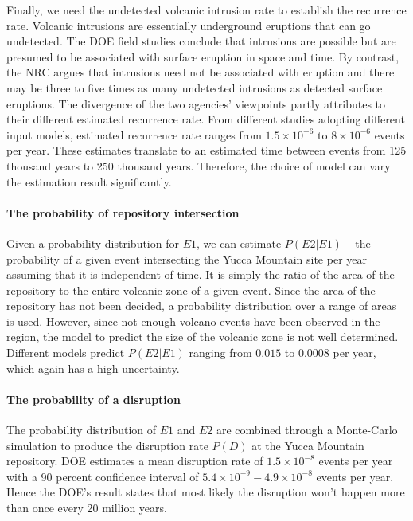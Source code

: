 \documentclass[nofootinbib,preprint,aps]{revtex4-1}
\begin{document}
        Finally, we need the undetected volcanic intrusion rate to establish the recurrence rate. Volcanic
        intrusions are essentially underground eruptions that can go undetected. The DOE field studies conclude
        that intrusions are possible but are presumed to be associated with surface eruption in space and time. 
        By contrast, the NRC argues that intrusions need not be associated with eruption and there
        may be three to five times as many undetected intrusions as detected surface eruptions. The divergence
        of the two agencies' viewpoints partly attributes to their different estimated recurrence rate.
        From different studies adopting different input models, estimated recurrence rate ranges from
        $1.5\times 10^{-6}$ to $8\times 10^{-6}$ events per year. These estimates translate to an estimated
        time between events from 125 thousand years to 250 thousand years. Therefore, the choice of
        model can vary the estimation result significantly.\cite{cv14}

        \paragraph{The probability of repository intersection}
        Given a probability distribution for $E1$, we can estimate $P(E2|E1)$ -- the probability of
        a given event intersecting the Yucca Mountain site per year assuming that it is independent
        of time. It is simply the ratio of the area of
        the repository to the entire volcanic zone of a given event. Since the area of the repository
        has not been decided, a probability distribution over a range of areas is used.
        However, since not enough volcano events have been observed in the region, the model
        to predict the size of the volcanic zone is not well determined.
        Different models predict $P(E2|E1)$ ranging from $0.015$ to $0.0008$ per year, which again has a high
        uncertainty.

        \paragraph{The probability of a disruption} The probability distribution of $E1$ and $E2$
        are combined through a Monte-Carlo simulation to produce the disruption rate $P(D)$
        at the Yucca Mountain repository. DOE estimates a mean disruption rate of $1.5\times 10^{-8}$ events
        per year with
        a 90 percent confidence interval of $5.4\times 10^{-9}-4.9\times 10^{-8}$ events per year. Hence the DOE's result
        states that most likely the disruption won't happen more than once every 20 million years.
\end{document}
